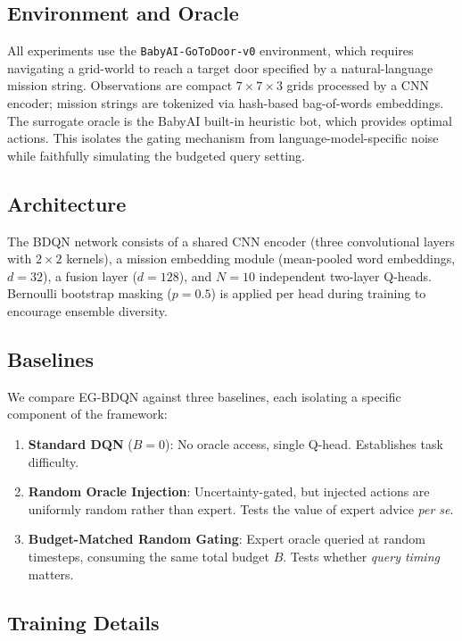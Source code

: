 \documentclass[11pt, a4paper]{article}
\begin{document}
\subsection{Environment and Oracle}

All experiments use the \texttt{BabyAI-GoToDoor-v0} environment, which requires navigating a grid-world to reach a target door specified by a natural-language mission string. Observations are compact $7 \times 7 \times 3$ grids processed by a CNN encoder; mission strings are tokenized via hash-based bag-of-words embeddings. The surrogate oracle is the BabyAI built-in heuristic bot, which provides optimal actions. This isolates the gating mechanism from language-model-specific noise while faithfully simulating the budgeted query setting.

\subsection{Architecture}

The BDQN network consists of a shared CNN encoder (three convolutional layers with $2 \times 2$ kernels), a mission embedding module (mean-pooled word embeddings, $d = 32$), a fusion layer ($d = 128$), and $N = 10$ independent two-layer Q-heads. Bernoulli bootstrap masking ($p = 0.5$) is applied per head during training to encourage ensemble diversity.

\subsection{Baselines}

We compare EG-BDQN against three baselines, each isolating a specific component of the framework:
\begin{enumerate}[leftmargin=*, label=(\roman*)]
    \item \textbf{Standard DQN} ($B = 0$): No oracle access, single Q-head. Establishes task difficulty.
    \item \textbf{Random Oracle Injection}: Uncertainty-gated, but injected actions are uniformly random rather than expert. Tests the value of expert advice \textit{per se}.
    \item \textbf{Budget-Matched Random Gating}: Expert oracle queried at random timesteps, consuming the same total budget $B$. Tests whether \textit{query timing} matters.
\end{enumerate}

\subsection{Training Details}
\end{document}
